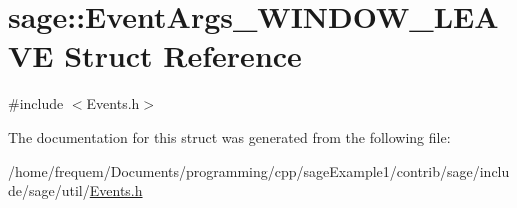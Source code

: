 \hypertarget{structsage_1_1EventArgs__WINDOW__LEAVE}{}\section{sage\+::Event\+Args\+\_\+\+W\+I\+N\+D\+O\+W\+\_\+\+L\+E\+A\+VE Struct Reference}
\label{structsage_1_1EventArgs__WINDOW__LEAVE}


{\ttfamily \#include $<$Events.\+h$>$}



The documentation for this struct was generated from the following file\+:\begin{DoxyCompactItemize}
\item 
/home/frequem/\+Documents/programming/cpp/sage\+Example1/contrib/sage/include/sage/util/\mbox{\hyperlink{Events_8h}{Events.\+h}}\end{DoxyCompactItemize}
